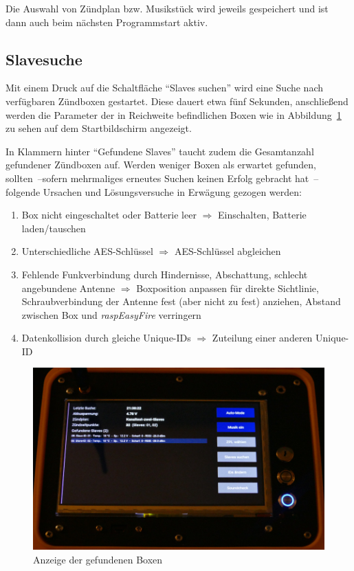 \documentclass[paper=a4, parskip, numbers=noenddot, toc=listof, headsepline]{scrbook}
\newcommand{\REF}{\emph{raspEasyFire}}
\begin{document}
				Die Auswahl von Zündplan bzw. Musikstück wird jeweils gespeichert und ist dann auch beim nächsten Programmstart aktiv.

			\subsection{Slavesuche}

				Mit einem Druck auf die Schaltfläche \enquote{Slaves suchen} wird eine Suche nach verfügbaren Zündboxen gestartet. Diese dauert etwa fünf Sekunden, anschließend werden die Parameter der in Reichweite befindlichen Boxen wie in Abbildung~\ref{fig:REFslavesfound} zu sehen auf dem Startbildschirm angezeigt.

				In Klammern hinter \enquote{Gefundene Slaves} taucht zudem die Gesamtanzahl gefundener Zündboxen auf. Werden weniger Boxen als erwartet gefunden, sollten~--sofern mehrmaliges erneutes Suchen keinen Erfolg gebracht hat~-- folgende Ursachen und Lösungsversuche in Erwägung gezogen werden:
				\begin{enumerate}
					\item
					      Box nicht eingeschaltet oder Batterie leer $\Rightarrow$ Einschalten, Batterie laden/tauschen
					\item
					      Unterschiedliche AES-Schlüssel $\Rightarrow$ AES-Schlüssel abgleichen
					\item
					      Fehlende Funkverbindung durch Hindernisse, Abschattung, schlecht angebundene Antenne $\Rightarrow$ Boxposition anpassen für direkte Sichtlinie, Schraubverbindung der Antenne fest (aber nicht zu fest) anziehen, Abstand zwischen Box und {\REF} verringern
					\item
					      Datenkollision durch gleiche Unique-IDs $\Rightarrow$ Zuteilung einer anderen Unique-ID
				\end{enumerate}

				\begin{figure}
					\centering\includegraphics[width=150mm]{Bilder/REFslavesfound}
					\caption{Anzeige der gefundenen Boxen}
					\label{fig:REFslavesfound}
				\end{figure}
\end{document}
